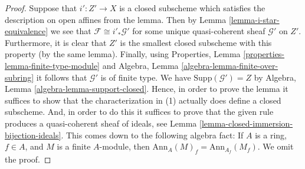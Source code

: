\documentclass[10pt,a4paper]{amsart}
\theoremstyle{plain}
\theoremstyle{definition}
\theoremstyle{remark}
\numberwithin{equation}{subsection}
\begin{document}
\begin{proof}
Suppose that $i' : Z' \to X$ is a closed subscheme which satisfies the
description on open affines from the lemma. Then by
Lemma \ref{lemma-i-star-equivalence}
we see that $\mathcal{F} \cong i'_*\mathcal{G}'$ for some unique
quasi-coherent sheaf $\mathcal{G}'$ on $Z'$. Furthermore, it is clear
that $Z'$ is the smallest closed subscheme with this property (by the
same lemma). Finally, using
Properties, Lemma \ref{properties-lemma-finite-type-module}
and
Algebra, Lemma \ref{algebra-lemma-finite-over-subring}
it follows that $\mathcal{G}'$ is of finite type. We have
$\text{Supp}(\mathcal{G}') = Z$ by
Algebra, Lemma \ref{algebra-lemma-support-closed}.
Hence, in order to prove the lemma it suffices to show that
the characterization in (1) actually does define a closed subscheme.
And, in order to do this it suffices to prove that the given rule
produces a quasi-coherent sheaf of ideals, see
Lemma \ref{lemma-closed-immersion-bijection-ideals}.
This comes down to the following algebra fact: If $A$ is a ring, $f \in A$,
and $M$ is a finite $A$-module, then
$\text{Ann}_A(M)_f = \text{Ann}_{A_f}(M_f)$.
We omit the proof.
\end{proof}
\end{document}
